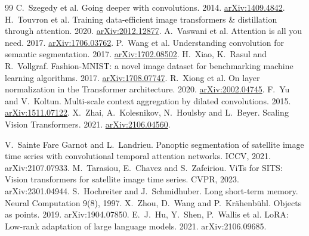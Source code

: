 \documentclass[11pt,a4paper]{article}
\begin{document}
\begin{thebibliography}{99}
 C.~Szegedy et al. Going deeper with convolutions. 2014.
  \href{https://arxiv.org/abs/1409.4842}{arXiv:1409.4842}.
 H.~Touvron et al. Training data-efficient image transformers \& distillation through attention. 2020.
  \href{https://arxiv.org/abs/2012.12877}{arXiv:2012.12877}.
 A.~Vaswani et al. Attention is all you need. 2017.
  \href{https://arxiv.org/abs/1706.03762}{arXiv:1706.03762}.
 P.~Wang et al. Understanding convolution for semantic segmentation. 2017.
  \href{https://arxiv.org/abs/1702.08502}{arXiv:1702.08502}.
 H.~Xiao, K.~Rasul and R.~Vollgraf. Fashion-MNIST: a novel image dataset for benchmarking machine learning
  algorithms. 2017. \href{https://arxiv.org/abs/1708.07747}{arXiv:1708.07747}.
 R.~Xiong et al. On layer normalization in the Transformer architecture. 2020.
  \href{https://arxiv.org/abs/2002.04745}{arXiv:2002.04745}.
 F.~Yu and V.~Koltun. Multi-scale context aggregation by dilated convolutions. 2015.
  \href{https://arxiv.org/abs/1511.07122}{arXiv:1511.07122}.
 X.~Zhai, A.~Kolesnikov, N.~Houlsby and L.~Beyer. Scaling Vision Transformers. 2021.
  \href{https://arxiv.org/abs/2106.04560}{arXiv:2106.04560}.

 V.~Sainte Fare Garnot and L.~Landrieu. Panoptic segmentation of satellite image time series with convolutional
temporal attention networks. ICCV, 2021. arXiv:2107.07933.
 M.~Tarasiou, E.~Chavez and S.~Zafeiriou. ViTs for SITS: Vision transformers for satellite image time series. CVPR,
2023. arXiv:2301.04944.
 S.~Hochreiter and J.~Schmidhuber. Long short-term memory. Neural Computation 9(8), 1997.
 X.~Zhou, D.~Wang and P.~Kr\"ahenb\"uhl. Objects as points. 2019. arXiv:1904.07850.
 E.~J.~Hu, Y.~Shen, P.~Wallis et al. LoRA: Low-rank adaptation of large language models. 2021. arXiv:2106.09685.
\end{thebibliography}
\end{document}
